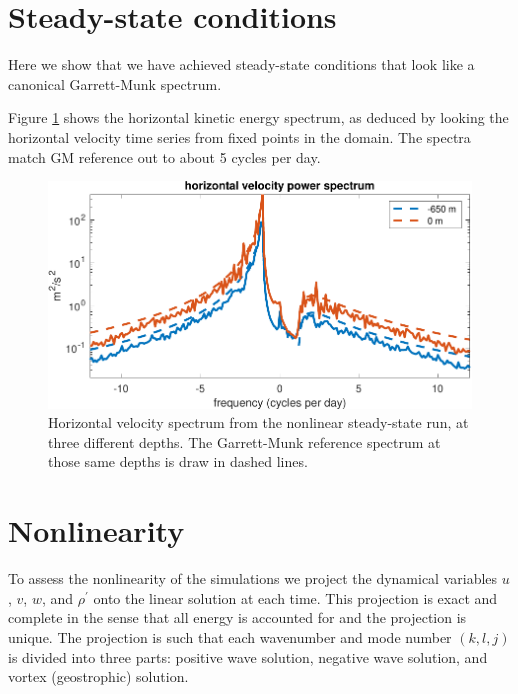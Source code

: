 \documentclass[10pt]{article}
\begin{document}
%
\section{Steady-state conditions}
%

Here we show that we have achieved steady-state conditions that look like a canonical Garrett-Munk spectrum.

Figure \ref{HorizontalVelocitySpectrum} shows the horizontal kinetic energy spectrum, as deduced by looking the horizontal velocity time series from fixed points in the domain. The spectra match  GM reference out to about 5 cycles per day.

\begin{figure}[t]
  \centerline{\includegraphics[width=39pc,angle=0]{figures/HorizontalVelocitySpectrum}}
  \caption{Horizontal velocity spectrum from the nonlinear steady-state run, at three different depths. The Garrett-Munk reference spectrum at those same depths is draw in dashed lines.}
  \label{HorizontalVelocitySpectrum}
\end{figure}

%
\section{Nonlinearity}
%

To assess the nonlinearity of the simulations we project the dynamical variables $u$, $v$, $w$, and $\rho^\prime$ onto the linear solution at each time. This projection is exact and complete in the sense that all energy is accounted for and the projection is unique. The projection is such that each wavenumber and mode number $(k,l,j)$ is divided into three parts: positive wave solution, negative wave solution, and vortex (geostrophic) solution.
\end{document}
